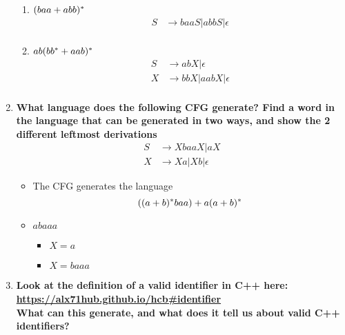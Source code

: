 \begin{enumerate}
\begin{enumerate}
    \item $(baa + abb) {}^\ast$
    \begin{equation*}
      \begin{aligned}
        S &\rightarrow baaS | abbS | \epsilon \\
      \end{aligned}
    \end{equation*}
  \item $ab (bb {}^\ast + aab ) {}^\ast$
    \begin{equation*}
      \begin{aligned}
        S &\rightarrow abX | \epsilon \\
        X &\rightarrow bbX | aabX | \epsilon \\
      \end{aligned}
    \end{equation*}
\end{enumerate}


\newpage
\item \textbf{What language does the following CFG generate? Find a word in the language that can be generated in two ways, and show the 2 different leftmost derivations}
    \begin{equation*}
      \begin{aligned}
        S &\rightarrow XbaaX | aX \\
        X &\rightarrow Xa | Xb | \epsilon
      \end{aligned}
    \end{equation*}
      \begin{itemize}
        \item The CFG generates the language 
          \[ ((a + b){}^\ast baa ) + a(a + b){}^\ast \]
        \item $abaaa$
        \begin{itemize}
          \item $X = a$
          \item $X = baaa$
        \end{itemize}
      \end{itemize}

\newpage
\item \textbf{Look at the definition of a valid identifier in C++ here:\\
    \url{https://alx71hub.github.io/hcb\#identifier}
    \\
What can this generate, and what does it tell us about valid C++ identifiers?}


\end{enumerate}
